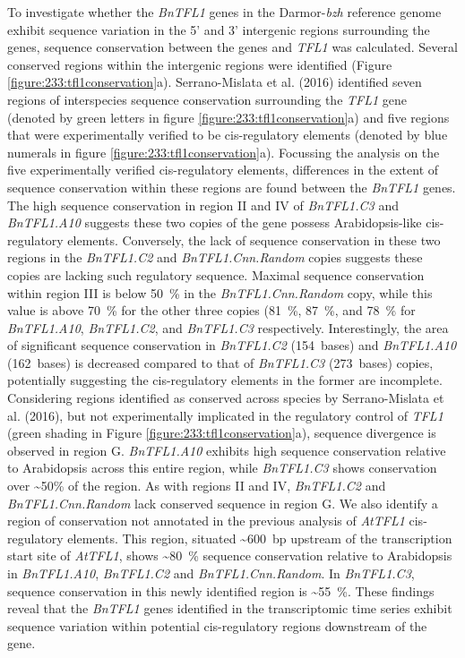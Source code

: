 \documentclass[12pt,]{book}
\begin{document}
To investigate whether the \emph{BnTFL1} genes in the Darmor-\emph{bzh}
reference genome exhibit sequence variation in the 5' and 3' intergenic
regions surrounding the genes, sequence conservation between the genes
and \emph{TFL1} was calculated. Several conserved regions within the
intergenic regions were identified (Figure
\ref{figure:233:tfl1conservation}a). Serrano-Mislata et al. (2016)
identified seven regions of interspecies sequence conservation
surrounding the \emph{TFL1} gene (denoted by green letters in figure
\ref{figure:233:tfl1conservation}a) and five regions that were
experimentally verified to be cis-regulatory elements (denoted by blue
numerals in figure \ref{figure:233:tfl1conservation}a). Focussing the
analysis on the five experimentally verified cis-regulatory elements,
differences in the extent of sequence conservation within these regions
are found between the \emph{BnTFL1} genes. The high sequence
conservation in region II and IV of \emph{BnTFL1.C3} and
\emph{BnTFL1.A10} suggests these two copies of the gene possess
Arabidopsis-like cis-regulatory elements. Conversely, the lack of
sequence conservation in these two regions in the \emph{BnTFL1.C2} and
\emph{BnTFL1.Cnn.Random} copies suggests these copies are lacking such
regulatory sequence. Maximal sequence conservation within region III is
below 50~\% in the \emph{BnTFL1.Cnn.Random} copy, while this value is
above 70~\% for the other three copies (81~\%, 87~\%, and 78~\% for
\emph{BnTFL1.A10}, \emph{BnTFL1.C2}, and \emph{BnTFL1.C3} respectively.
Interestingly, the area of significant sequence conservation in
\emph{BnTFL1.C2} (154~bases) and \emph{BnTFL1.A10} (162~bases) is
decreased compared to that of \emph{BnTFL1.C3} (273~bases) copies,
potentially suggesting the cis-regulatory elements in the former are
incomplete. Considering regions identified as conserved across species
by Serrano-Mislata et al. (2016), but not experimentally implicated in
the regulatory control of \emph{TFL1} (green shading in Figure
\ref{figure:233:tfl1conservation}a), sequence divergence is observed in
region G. \emph{BnTFL1.A10} exhibits high sequence conservation relative
to Arabidopsis across this entire region, while \emph{BnTFL1.C3} shows
conservation over \textasciitilde{}50\% of the region. As with regions
II and IV, \emph{BnTFL1.C2} and \emph{BnTFL1.Cnn.Random} lack conserved
sequence in region G. We also identify a region of conservation not
annotated in the previous analysis of \emph{AtTFL1} cis-regulatory
elements. This region, situated \textasciitilde{}600~bp upstream of the
transcription start site of \emph{AtTFL1}, shows \textasciitilde{}80~\%
sequence conservation relative to Arabidopsis in \emph{BnTFL1.A10},
\emph{BnTFL1.C2} and \emph{BnTFL1.Cnn.Random}. In \emph{BnTFL1.C3},
sequence conservation in this newly identified region is
\textasciitilde{}55~\%. These findings reveal that the \emph{BnTFL1}
genes identified in the transcriptomic time series exhibit sequence
variation within potential cis-regulatory regions downstream of the
gene.
\end{document}
